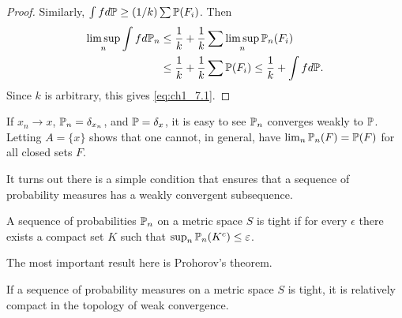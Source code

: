 \begin{proof}
Similarly, $\int f d\P \geq (1/k)\sum \P(F_i)$. Then
\begin{align*}
    \limsup_n \int f d\P_n &\leq \frac{1}{k} + \frac{1}{k}\sum \limsup_n \P_n(F_i) \\
    &\leq \frac{1}{k}+\frac{1}{k}\sum\P(F_i) \leq \frac{1}{k} + \int f d\P.
\end{align*}
Since $k$ is arbitrary, this gives \eqref{eq:ch1_7.1}.
\end{proof}

If $x_n \to x$, $\P_n = \delta_{x_n}$, and $\P = \delta_x$, it is easy to see $\P_n$ converges weakly to $\P$. Letting $A = \{x\}$ shows that one cannot, in general, have $\lim_n \P_n(F) = \P(F)$ for all closed sets $F$.


It turns out there is a simple condition that ensures that a sequence of probability measures has a weakly convergent subsequence.

\begin{definition}\label{def:ch1_7.3}
A sequence of probabilities $\P_n$ on a metric space $S$ is tight if for every $\epsilon$ there exists a compact set $K$ such that $\sup_n \P_n(K^c) \leq \epsilon$.
\end{definition}

The most important result here is Prohorov's theorem.

\begin{theorem}\label{thm:ch1_7.4}
If a sequence of probability measures on a metric space $S$ is tight, it is relatively compact in the topology of weak convergence.
\end{theorem}

